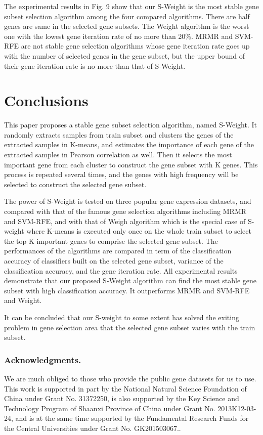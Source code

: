 \documentclass[runningheads,a4paper]{llncs}
\begin{document}
The experimental results in Fig. 9 show that our S-Weight is the most stable gene subset selection algorithm among the four compared algorithms. There are half genes are same in the selected gene subsets.  The Weight algorithm is the worst one with the lowest gene iteration rate of no more than 20\%. MRMR and SVM-RFE are not stable gene selection algorithms whose gene iteration rate goes up with the number of selected genes in the gene subset, but the upper bound of their gene iteration rate is no more than that of S-Weight. 


\section{Conclusions}

This paper proposes a stable gene subset selection algorithm, named S-Weight. It randomly extracts samples from train subset and clusters the genes of the extracted samples in K-means, and estimates the importance of each gene of the extracted samples in Pearson correlation as well. Then it selects the most important gene from each cluster to construct the gene subset with K genes. This process is repeated several times, and the genes with high frequency will be selected to construct the selected gene subset. 

The power of S-Weight is tested on three popular gene expression datasets, and compared with that of the famous gene selection algorithms including MRMR and SVM-RFE, and with that of Weigh algorithm which is the special case of S-weight where K-means is executed only once on the whole train subset to select the top K important genes to comprise the selected gene subset. The performances of the algorithms are compared in term of the classification accuracy of classifiers built on the selected gene subset, variance of the classification accuracy, and the gene iteration rate. All experimental results demonstrate that our proposed S-Weight algorithm can find the most stable gene subset with high classification accuracy. It outperforms MRMR and SVM-RFE and Weight. 

It can be concluded that our S-weight to some extent has solved the exiting problem in gene selection area that the selected gene subset varies with the train subset.


\subsubsection*{Acknowledgments.}
We are much obliged to those who provide the public gene datasets for us to use. This work is supported in part by the National Natural Science Foundation of China under Grant No. 31372250, is also supported by the Key Science and Technology Program of Shaanxi Province of China under Grant No. 2013K12-03-24, and is at the same time supported by the Fundamental Research Funds for the Central Universities under Grant No. GK201503067..
\end{document}
